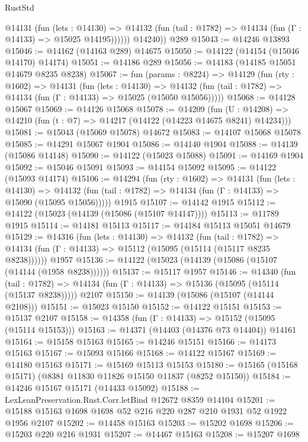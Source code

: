 \begin{lexlean}{RustStd}
\begin{coremodule}
            @14131
              (fun (lets : @14130) =>
              @14132 (fun (tail : @1782) => @14134 (fun (Γ : @14133) => @15025 @14195))))))
        @14240))
    @289
@15043 := @14246 @13893
@15046 := @14162 (@14163 @289) @14675
@15050 := @14122 (@14154 (@15046 @14170) @14174)
@15051 := @14186 @289
@15056 := @14183 (@14185 @15051 @14679 @8235 @8238)
@15067 := fun (params : @8224) =>
  @14129
    (fun (rty : @1602) =>
    @14131
      (fun (lets : @14130) =>
      @14132 (fun (tail : @1782) => @14134 (fun (Γ : @14133) => @15025 (@15050 @15056)))))
@15068 := @14128 @15067
@15069 := @14126 @15068
@15078 := @14209
    (fun (U : @14208) => @14210 (fun (t : @7) => @14217 (@14122 (@14223 @14675 @8241) @14234)))
@15081 := @15043 (@15069 @15078) @14672
@15083 := @14107 @15068 @15078
@15085 := @14291 @15067 @1904
@15086 := @14140 @1904
@15088 := @14139 (@15086 @14148)
@15090 := @14122 (@15023 @15088)
@15091 := @14169 @1904
@15092 := @15046 @15091
@15093 := @14154 @15092
@15095 := @14122 (@15093 @14174)
@15106 := @14294
    (fun (rty : @1602) =>
    @14131
      (fun (lets : @14130) =>
      @14132 (fun (tail : @1782) => @14134 (fun (Γ : @14133) => @15090 (@15095 @15056)))))
    @1915
@15107 := @14142 @1915
@15112 := @14122 (@15023 (@14139 (@15086 (@15107 @14147))))
@15113 := @11789 @1915
@15114 := @14181 @15113
@15117 := @14184 @15113 @15051 @14679
@15129 := @14316
    (fun (lets : @14130) =>
    @14132
      (fun (tail : @1782) =>
      @14134 (fun (Γ : @14133) => @15112 (@15095 (@15114 (@15117 @8235 @8238))))))
    @1957
@15136 := @14122 (@15023 (@14139 (@15086 (@15107 (@14144 (@1958 @8238))))))
@15137 := @15117 @1957
@15146 := @14340
    (fun (tail : @1782) => @14134 (fun (Γ : @14133) => @15136 (@15095 (@15114 (@15137 @8238)))))
    @2107
@15150 := @14139 (@15086 (@15107 (@14144 @2108)))
@15151 := @15023 @15150
@15152 := @14122 @15151
@15153 := @15137 @2107
@15158 := @14358 (fun (Γ : @14133) => @15152 (@15095 (@15114 @15153)))
@15163 := @14371 (@14403 (@14376 @73 @14404)) @14161
@15164 := @15158 @15163
@15165 := @14246 @15151
@15166 := @14173 @15163
@15167 := @15093 @15166
@15168 := @14122 @15167
@15169 := @14180 @15163
@15171 := @15169 @15113 @15153
@15180 := @15165 (@15168 @15171) (@8381 @11830 @11826 @15150 @11837 (@8252 @15150))
@15184 := @14246 @15167 @15171 (@14433 @15092)
@15188 := LexLeanPreservation.Rust.Corr.letBind @12672 @8359 @14104
@15201 := @15188 @15163 @1698 @1698 @52 @216 @220 @287 @210 @1931 @52 @1922 @1956 @2107
@15202 := @14458 @15163
@15203 := @15202 @1698
@15206 := @15203 @220 @216 @1931
@15207 := @14467 @15163
@15208 := @15207 @1698

\end{coremodule}
\end{lexlean}
